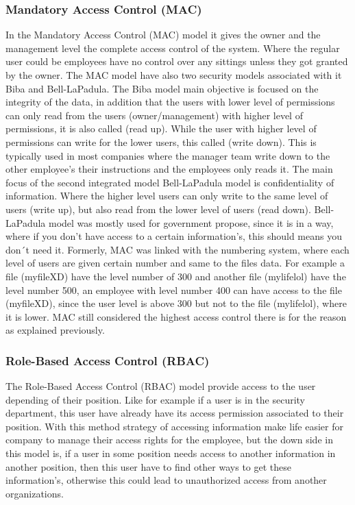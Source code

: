 \documentclass[conference]{IEEEtran}
\begin{document}
\subsubsection{	Mandatory Access Control (MAC)}\label{(MAC)}
\newline
In the Mandatory Access Control (MAC) model it gives the owner and the management level the complete access control of the system. Where the regular user could be employees have no control over any sittings unless they got granted by the owner. The MAC model have also two security models associated with it Biba and Bell-LaPadula. The Biba model main objective is focused on the integrity of the data, in addition that the users with lower level of permissions can only read from the users (owner/management) with higher level of permissions, it is also called (read up). While the user with higher level of permissions can write for the lower users, this called (write down). This is typically used in most companies where the manager team write down to the other employee’s their instructions and the employees only reads it.
\newline
The main focus of the second integrated model Bell-LaPadula model is confidentiality of information. Where the higher level users can only write to the same level of users (write up), but also read from the lower level of users (read down). Bell-LaPadula model was mostly used for government propose, since it is in a way, where if you don’t have access to a certain information’s, this should means you don´t need it. Formerly, MAC was linked with the numbering system, where each level of users are given certain number and same to the files data. For example a file (myfileXD) have the level number of 300 and another file (mylifelol) have the level number 500, an employee with level number 400 can have access to the file (myfileXD), since the user level is above 300 but not to the file (mylifelol), where it is lower. MAC still considered the highest access control there is for the reason as explained previously.
\newline
\subsubsection{Role-Based Access Control (RBAC)}\label{(RBAC)}
\newline
The Role-Based Access Control (RBAC) model provide access to the user depending of their position. Like for example if a user is in the security department, this user have already have its access permission associated to their position. With this method strategy of accessing information make life easier for company to manage their access rights for the employee, but the down side in this model is, if a user in some position needs access to another information in another position, then this user have to find other ways to get these information’s, otherwise this could lead to unauthorized access from another organizations.
\newline
\end{document}
